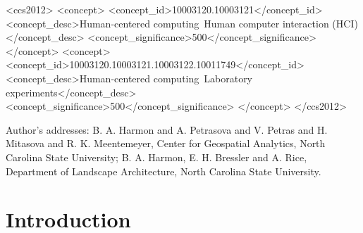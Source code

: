 \documentclass[prodmode,acmtochi]{acmsmall} %
\begin{document}
%
%
\begin{CCSXML}
<ccs2012>
<concept>
<concept_id>10003120.10003121</concept_id>
<concept_desc>Human-centered computing~Human computer interaction (HCI)</concept_desc>
<concept_significance>500</concept_significance>
</concept>
<concept>
<concept_id>10003120.10003121.10003122.10011749</concept_id>
<concept_desc>Human-centered computing~Laboratory experiments</concept_desc>
<concept_significance>500</concept_significance>
</concept>
</ccs2012>
\end{CCSXML}

%
%



\begin{bottomstuff}
Author's addresses: B. A. Harmon {and} A. Petrasova {and} V. Petras {and} H. Mitasova {and} R. K. Meentemeyer, Center for Geospatial Analytics, North Carolina State University; B. A. Harmon, E. H. Bressler {and} A. Rice, Department of Landscape Architecture, North Carolina State University.
\end{bottomstuff}


\maketitle

\section{Introduction}
\end{document}
